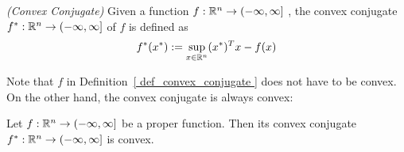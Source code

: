 \begin{definition}
  \label{ def_convex_conjugate }
  \emph{(Convex Conjugate)}
  Given a function
  $
    f:
    \mathbb{R}^n \to ( - \infty, \infty ]
  $
  ,
  the convex conjugate
  $
    f^*:
    \mathbb{R}^n \to ( - \infty, \infty ]
  $
  of $f$ is defined as
  \begin{gather}
    f^*(x^*)
    :=
    \sup_{ x \in \mathbb{R}^n }
    (x^*)^T x - f(x)
  \end{gather}
\end{definition}

Note that $f$ in Definition~\ref{ def_convex_conjugate }
does not have to be convex. On the other hand, the convex conjugate is always convex:

\begin{proposition}
  Let  
  $
    f:
    \mathbb{R}^n \to ( - \infty, \infty ]
  $
  be a proper function. 
  Then its convex conjugate
  $
    f^*:
    \mathbb{R}^n \to ( - \infty, \infty ]
  $
  is convex.
\end{proposition}


